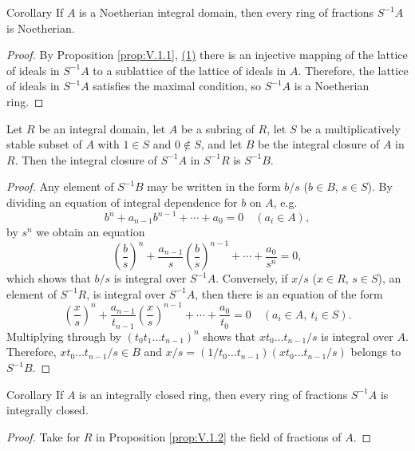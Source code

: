 \begin{statement}{Corollary}
If $A$ is a Noetherian integral domain, then every ring of fractions
$S^{-1}A$ is Noetherian.
\end{statement}

\begin{proof}
By Proposition \ref{prop:V.1.1}, \hyperref[prop:V.1.1.1]{(1)} there is an injective mapping of the
lattice of ideals in $S^{-1}A$ to a sublattice of the lattice of ideals in
$A$. Therefore, the lattice of ideals in $S^{-1}A$ satisfies the maximal
condition, so $S^{-1}A$ is a Noetherian ring.
\end{proof}

\begin{proposition}
\label{prop:V.1.2}
Let $R$ be an integral domain, let $A$ be a subring of $R$, let $S$ be a
multiplicatively stable subset of $A$ with $1\in S$ and $0\notin S$, and let
$B$ be the integral closure of $A$ in $R$. Then the integral closure of
$S^{-1}A$ in $S^{-1}R$ is $S^{-1}B$.
\end{proposition}

\begin{proof}
Any element of $S^{-1}B$ may be written in the form $b/s$ ($b\in B$,
$s\in S$). By dividing an equation of integral dependence for $b$ on $A$,
e.g.
\[
b^{n}+a_{n-1}b^{n-1}+\cdots+a_{0}=0\quad(a_{i}\in A),
\]
by $s^{n}$ we obtain an equation
\[
\left(\frac{b}{s}\right)^{n}+\frac{a_{n-1}}{s}
\left(\frac{b}{s}\right)^{n-1}+\cdots+\frac{a_{0}}{s^{n}}=0,
\]
which shows that $b/s$ is integral over $S^{-1}A$. Conversely, if $x/s$
($x\in R$, $s\in S$), an element of $S^{-1}R$, is integral over $S^{-1}A$,
then there is an equation of the form
\[
\left(\frac{x}{s}\right)^{n}+\frac{a_{n-1}}{t_{n-1}}
\left(\frac{x}{s}\right)^{n-1}+\cdots+\frac{a_{0}}{t_{0}}=0
\quad(a_{i}\in A,\ t_{i}\in S).
\]
Multiplying through by $(t_{0}t_{1}\ldots t_{n-1})^{n}$ shows that
$x t_{0}\ldots t_{n-1}/s$ is integral over $A$. Therefore,
$x t_{0}\ldots t_{n-1}/s\in B$ and
$x/s=(1/t_{0}\ldots t_{n-1})(x t_{0}\ldots t_{n-1}/s)$ belongs to
$S^{-1}B$.
\end{proof}

\begin{statement}{Corollary}
If $A$ is an integrally closed ring, then every ring of fractions $S^{-1}A$
is integrally closed.
\end{statement}

\begin{proof}
Take for $R$ in Proposition \ref{prop:V.1.2} the field of fractions of $A$.
\end{proof}

